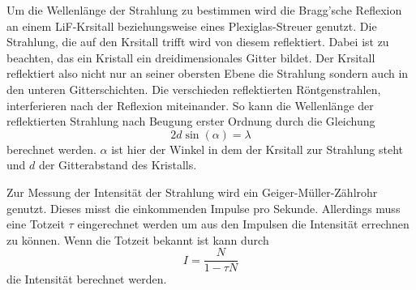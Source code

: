 Um die Wellenlänge der Strahlung zu bestimmen wird die Bragg'sche Reflexion an einem LiF-Krsitall beziehungsweise eines Plexiglas-Streuer genutzt.
Die Strahlung, die auf den Krsitall trifft wird von diesem reflektiert.
Dabei ist zu beachten, das ein Kristall ein dreidimensionales Gitter bildet.
Der Krsitall reflektiert also nicht nur an seiner obersten Ebene die Strahlung sondern auch in den unteren Gitterschichten.
Die verschieden reflektierten Röntgenstrahlen, interferieren nach der Reflexion miteinander.
So kann die Wellenlänge der reflektierten Strahlung nach Beugung erster Ordnung durch die Gleichung
\begin{equation}
    2 d \sin(\alpha) = \lambda
    \label{eq:bragg}
\end{equation}
berechnet werden.
$\alpha$ ist hier der Winkel in dem der Krsitall zur Strahlung steht und $d$ der Gitterabstand des Kristalls.

Zur Messung der Intensität der Strahlung wird ein Geiger-Müller-Zählrohr genutzt.
Dieses misst die einkommenden Impulse pro Sekunde.
Allerdings muss eine Totzeit $\tau$ eingerechnet werden um aus den Impulsen die Intensität errechnen zu können.
Wenn die Totzeit bekannt ist kann durch 
\begin{equation}
    I = \frac{N}{1-\tau N}
    \label{eq:intens}
\end{equation}
die Intensität berechnet werden.
